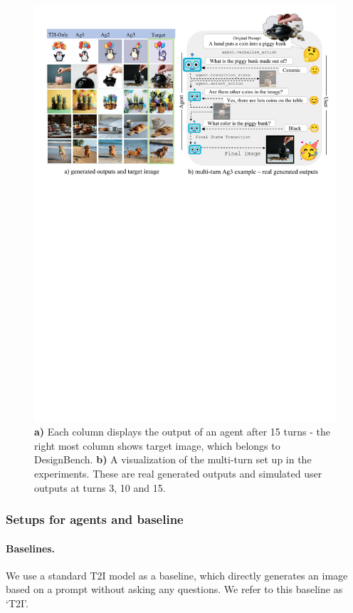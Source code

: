 \begin{figure}[hbt!]
    \centering
    \includegraphics[width=\linewidth]{figures/results_figure.pdf}
    \caption{\textbf{a)} Each column displays the output of an agent after 15 turns - the right most column shows target image, which belongs to DesignBench. \textbf{b)} A visualization of the multi-turn set up in the experiments. These are real generated outputs and simulated user outputs at turns 3, 10 and 15.}
    \label{fig:visualization}
    \vspace{-1em}
\end{figure}

\subsubsection{Setups for agents and baseline}
\vspace{-.5em}
\paragraph{Baselines.\;} We use a standard T2I model as a baseline, which directly generates an image based on a prompt without asking any questions. We refer to this baseline as `T2I'. 
\vspace{-1em}
